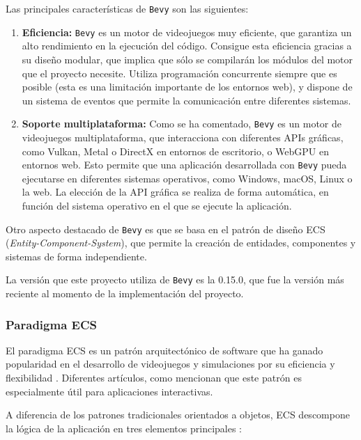 Las principales características de \texttt{Bevy} son las siguientes:
\begin{enumerate}
    \item \textbf{Eficiencia:} \texttt{Bevy} es un motor de videojuegos muy eficiente, que garantiza un alto rendimiento en la ejecución del código. Consigue esta eficiencia gracias a su diseño modular, que implica que sólo se compilarán los módulos del motor que el proyecto necesite. Utiliza programación concurrente siempre que es posible (esta es una limitación importante de los entornos web), y dispone de un sistema de eventos que permite la comunicación entre diferentes sistemas.
    \item \textbf{Soporte multiplataforma:} Como se ha comentado, \texttt{Bevy} es un motor de videojuegos multiplataforma, que interacciona con diferentes APIs gráficas, como Vulkan, Metal o DirectX en entornos de escritorio, o WebGPU en entornos web. Esto permite que una aplicación desarrollada con \texttt{Bevy} pueda ejecutarse en diferentes sistemas operativos, como Windows, macOS, Linux o la web. La elección de la API gráfica se realiza de forma automática, en función del sistema operativo en el que se ejecute la aplicación.
\end{enumerate}

Otro aspecto destacado de \texttt{Bevy} es que se basa en el patrón de diseño ECS (\textit{Entity-Component-System}), que permite la creación de entidades, componentes y sistemas de forma independiente. 

La versión que este proyecto utiliza de \texttt{Bevy} es la 0.15.0, que fue la versión más reciente al momento de la implementación del proyecto.

\subsubsection{Paradigma \acs{ECS}} \label{subsec:ecs}

El paradigma \ac{ECS} es un patrón arquitectónico de software que ha ganado popularidad en el desarrollo de videojuegos y simulaciones por su eficiencia y flexibilidad \autocite{prdevingDeepdivingEntityComponent2023}. Diferentes artículos, como \autocite{zaksWhenNotUse2018} mencionan que este patrón es especialmente útil para aplicaciones interactivas.

A diferencia de los patrones tradicionales orientados a objetos, \ac{ECS} descompone la lógica de la aplicación en tres elementos principales \autocite{SistemaComponentesEntidad2024}:

